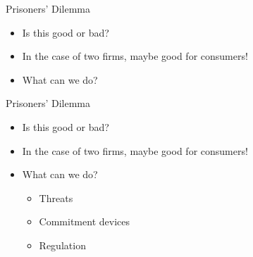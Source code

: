 \documentclass[aspectratio=169]{beamer}
\begin{document}
\begin{frame}{Prisoners' Dilemma}
    \begin{itemize}
        \item Is this good or bad?
        \item In the case of two firms, maybe good for consumers!
        \item What can we do?
    \end{itemize}
\end{frame}

\begin{frame}{Prisoners' Dilemma}
    \begin{itemize}
        \item Is this good or bad?
        \item In the case of two firms, maybe good for consumers!
        \item What can we do?
        \begin{itemize}
            \item Threats
            \item Commitment devices
            \item Regulation
        \end{itemize}
    \end{itemize}
\end{frame}
\end{document}
